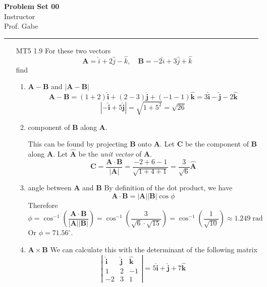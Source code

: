 \documentclass[12pt]{article}
\newcommand{\paren}[1]{\left( #1 \right)}
\newcommand{\abso}[1]{\left|#1 \right|}
\newcommand{\uni}{\hat{\mathbf{i}}}
\newcommand{\unj}{\hat{\mathbf{j}}}
\newcommand{\unk}{\hat{\mathbf{k}}}
\newif\ifshow
\begin{document}
\begin{center}
\ifshow
  \textbf{\Large Problem Set 00 Solution}\\
\else
  \textbf{\Large Problem Set 00}\\
\fi
Instructor \\ Prof. Gabe\\
\end{center}

\hrule

\vspace{0.2cm}



\begin{enumerate}
    \item[MT5 1.9] For these two vectors
\[
\mathbf{A} = \hat{i} + 2\hat{j} - \hat{k}, \quad \mathbf{B} = -2\hat{i} + 3\hat{j} + \hat{k}
\]
find
\begin{enumerate}
    \item \(\mathbf{A} - \mathbf{B}\) and \(|\mathbf{A} - \mathbf{B}|\)
    \[
    \mathbf{A} - \mathbf{B} = (1+2)\uni + (2-3)\unj + (-1-1)\unk = 3\uni - \unj - 2\unk
    \]
    \[
    \abso{-\uni + 5 \unj} = \sqrt{1+5^2} = \sqrt{26}
    \]
    \item component of \(\mathbf{B}\) along \(\mathbf{A}\).
    
    This can be found by projecting \textbf{B} onto \textbf{A}. Let \textbf{C} be the component of \textbf{B} along \textbf{A}. Let $\hat{\mathbf{A}}$ be the \textit{unit vector} of \textbf{A}.
    \[
    \mathbf{C} = \frac{\mathbf{A}\cdot \mathbf{B}}{\abso{\mathbf{A}}} = \frac{-2+6-1}{\sqrt{1+4+1}} = \frac{3}{\sqrt{6}}\hat{\mathbf{A}}
    \]
    
    \item angle between \(\mathbf{A}\) and \(\mathbf{B}\)
    By definition of the dot product, we have
    \[
    \mathbf{A}\cdot \mathbf{B} = \abso{\mathbf{A}}\abso{\mathbf{B}}\cos\phi
    \]
    Therefore
    \[
    \phi = \cos^{-1}\paren{\frac{\mathbf{A}\cdot \mathbf{B}}{\abso{\mathbf{A}}\abso{\mathbf{B}}}} = \cos^{-1}\paren{\frac{3}{\sqrt{6}\cdot \sqrt{15}}} = \cos^{-1}\paren{\frac{1}{\sqrt{10}}} \approx 1.249 \; \text{rad}
    \]
    Or $\phi = 71.56^\circ$.
    
    \item \(\mathbf{A} \times \mathbf{B}\)
    We can calculate this with the determinant of the following matrix
    \[
    \abso{
    \begin{matrix}
        \uni & \unj & \unk\\
        1 & 2 & -1\\
        -2& 3 & 1
    \end{matrix}
    } = 5\uni + \unj + 7\unk 
    \]
    

\end{enumerate}
\end{enumerate}
\end{document}
